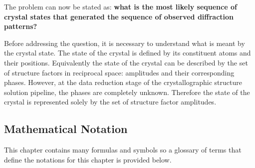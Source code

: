 The problem can now be stated as:
\textbf{what is the most likely sequence of crystal states that generated the sequence of observed diffraction patterns?}

Before addressing the question, it is necessary to understand what is meant by the crystal state.
The state of the crystal is defined by its constituent atoms and their positions.
Equivalently the state of the crystal can be described by the set of structure factors in reciprocal space: amplitudes and their corresponding phases.
However, at the data reduction stage of the crystallographic structure solution pipeline, the phases are completely unknown.
Therefore the state of the crystal is represented solely by the set of structure factor amplitudes.

\subsection{Mathematical Notation}
\label{sub:Mathematical Notation}
This chapter contains many formulas and symbols so a glossary of terms that define the notations for this chapter is provided below.

